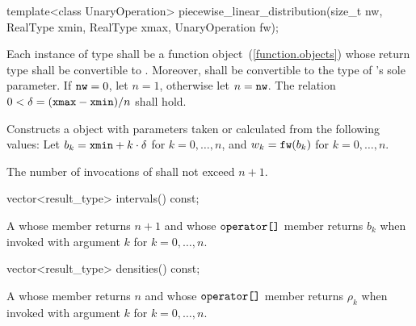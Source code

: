 %
\begin{itemdecl}
template<class UnaryOperation>
 piecewise_linear_distribution(size_t nw, RealType xmin, RealType xmax, UnaryOperation fw);
\end{itemdecl}

\begin{itemdescr}
\pnum\requires
 Each instance of type 
 shall be a function object~(\ref{function.objects})
 whose return type shall be convertible to .
 Moreover,
  shall be convertible
 to the type of 's sole parameter.
 If $ \texttt{nw} = 0 $, let $ n = 1 $, otherwise let $n = \texttt{nw}$.
 The relation $ 0 < \delta = (\texttt{xmax} - \texttt{xmin}) / n $
 shall hold.

\pnum\effects Constructs a  object
 with parameters taken or calculated
 from the following values:
 Let $ b_k = \texttt{xmin} + k \cdot \delta $ for $ k = 0, \ldots, n $,
 and $ w_k = \texttt{fw}(b_k) $ for $ k = 0, \ldots, n $.

\pnum\complexity
 The number of invocations of  shall not exceed $n+1$.
\end{itemdescr}

%
%
\begin{itemdecl}
vector<result_type> intervals() const;
\end{itemdecl}

\begin{itemdescr}
\pnum\returns A 
 whose  member returns $n + 1$
 and whose $ \texttt{operator[]} $ member returns $b_k$
 when invoked with argument $k$ for $k = 0, \ldots, n $.
\end{itemdescr}

%
%
\begin{itemdecl}
vector<result_type> densities() const;
\end{itemdecl}

\begin{itemdescr}
\pnum\returns A 
 whose  member returns $n$
 and whose $ \texttt{operator[]} $ member returns $\rho_k$
 when invoked with argument $k$ for $ k = 0, \ldots, n $.
\end{itemdescr}%
%
%
%
%

